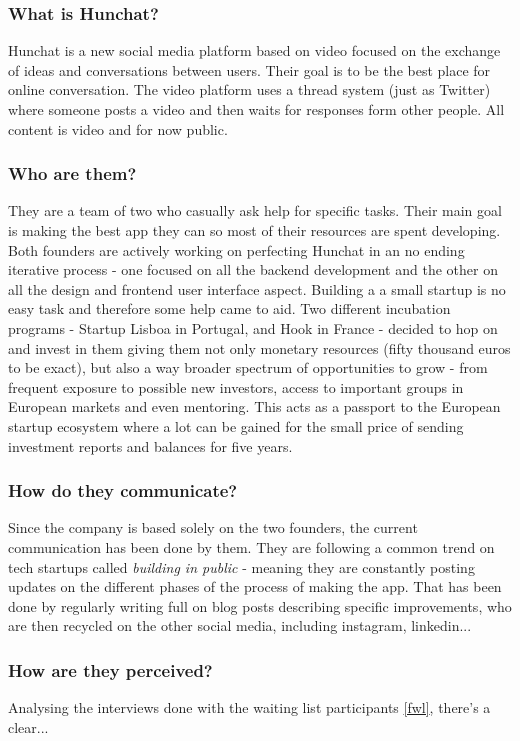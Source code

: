 \documentclass[12pt]{article}
\begin{document}
	\subsubsection{What is Hunchat?}
Hunchat is a new social media platform based on video focused on the exchange of ideas and conversations between users. Their goal is to be the best place for online conversation. The video platform uses a thread system (just as Twitter) where someone posts a video and then waits for responses form other people. All content is video and for now public.

	\subsubsection{Who are them?}
They are a team of two who casually ask help for specific tasks. Their main goal is making the best app they can so most of their resources are spent developing. Both founders are actively working on perfecting Hunchat in an no ending iterative process - one focused on all the backend development and the other on all the design and frontend user interface aspect. Building a a small startup is no easy task and therefore some help came to aid. Two different incubation programs - Startup Lisboa in Portugal, and Hook in France - decided to hop on and invest in them giving them not only monetary resources (fifty thousand euros to be exact), but also a way broader spectrum of opportunities to grow - from frequent exposure to possible new investors, access to important groups in European markets and even mentoring. This acts as a passport to the European startup ecosystem where a lot can be gained for the small price of sending investment reports and balances for five years.

	\subsubsection{How do they communicate?}
Since the company is based solely on the two founders, the current communication has been done by them. They are following a common trend on tech startups called \textit{building in public} - meaning they are constantly posting updates on the different phases of the process of making the app. That has been done by regularly writing full on blog posts describing specific improvements, who are then recycled on the other social media, including instagram, linkedin...

	\subsubsection{How are they perceived?}
Analysing the interviews done with the waiting list participants \ref{fwl}, there's a clear...
\end{document}
